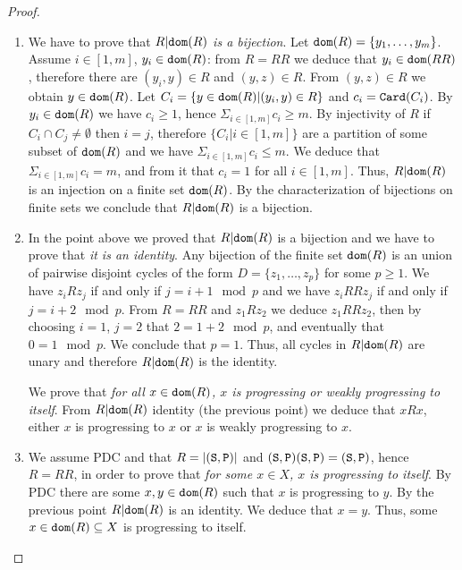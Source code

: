 \documentclass{lmcs}
\begin{document}
\begin{proof}
\begin{enumerate}
\item
We have to prove that \emph{$R {|} {\tt dom}(R) $ is a bijection}. 
Let ${\tt dom}(R) = \{y_1, \ldots, y_m\}$. Assume
$i \in [1,m]$, $y_i \in {\tt dom}(R)$: 
from $R=RR$ we deduce that $y_i \in {\tt dom}(RR)$, therefore
there are $(y_i,y) \in R$ and $(y,z) \in R$. From $(y,z) \in R$ 
we obtain $y \in {\tt dom}(R)$. 
Let $C_i = \{y \in {\tt dom}(R) |(y_i,y) \in R\}$ and $c_i = {\tt Card}(C_i)$. 
By $y_i \in {\tt dom}(R)$ 
we have $c_i \ge 1$, hence $\Sigma_{i \in [1,m]} c_i \ge m$. 
By injectivity of $R$ if  $C_i \cap C_j \not = \emptyset$ then $i=j$, therefore 
$\{C_i | i \in [1,m]\}$ are a partition of some subset of ${\tt dom}(R)$
and we have $\Sigma_{i \in [1,m]} c_i \le m$. 
We deduce that $\Sigma_{i \in [1,m]} c_i  = m$,
and from it that $c_i=1$ for all $i \in [1,m]$. Thus, 
$R {|} {\tt dom}(R) $ is an injection on a finite set ${\tt dom}(R)$.
By the characterization of bijections on finite sets we 
conclude that $R {|} {\tt dom}(R) $ is a bijection.

\item
In the point above we proved that $R {|} {\tt dom}(R) $ is 
a bijection and we have to prove that \emph{it is an identity}. Any bijection
of the finite set ${\tt dom}(R)$ is an union of pairwise disjoint cycles of the form 
$D = \{z_1, \ldots, z_p\}$ for some $p \ge 1$. We have $z_i R z_j$
if and only if $j = i+1 \mod p$ and we have
$z_i RR z_j$ if and only if $j = i+2 \mod p$.
From $R=RR$ and $z_1 R z_2$ we deduce $z_1 RR z_2$, then by choosing
$i=1$, $j=2$ that $2=1+2 \mod p$, and eventually that $0=1 \mod p$. 
We conclude that $p=1$. Thus, all cycles in
$R {|} {\tt dom}(R) $ are unary and therefore
$R {|} {\tt dom}(R) $ is the identity.

We prove that \emph{for all $x \in {\tt dom}(R)$, $x$ is progressing or 
weakly progressing to itself}.
From $R {|} {\tt dom}(R)$ identity (the previous point)
we deduce that $x R x$, either $x$ is progressing to $x$ or 
$x$ is weakly progressing to $x$.

\item
We assume PDC and that $R = {| ({\tt S},{\tt P}) |}$ and $({\tt S},{\tt P}) ({\tt S},{\tt P}) = 
({\tt S},{\tt P})$, hence $R=RR$, 
in order to prove that \emph{for some $x \in X$, $x$ is progressing to itself}.
By PDC there are some $x,y \in {\tt dom}(R)$ such that $x$ is progressing to $y$.
By the previous point $R {|} {\tt dom}(R) $ is an identity.
We deduce that $x=y$. Thus, some $x \in {\tt dom}(R) \subseteq X$ is progressing to itself.

\end{enumerate}
\end{proof}
\end{document}
